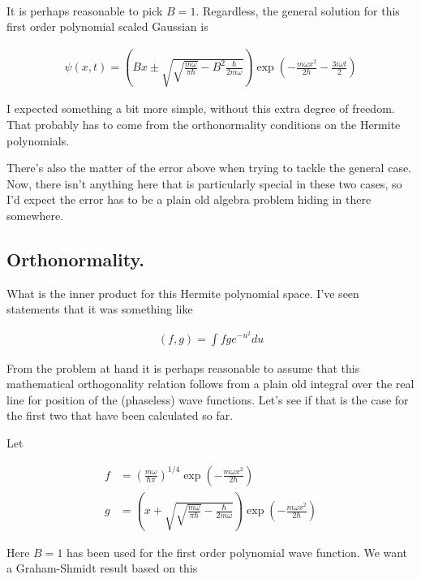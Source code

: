 \documentclass{article}
\begin{document}
\begin{align*}
\end{align*}

It is perhaps reasonable to pick $B=1$.  Regardless, the general solution for this first order polynomial scaled Gaussian is

\begin{align*}
\psi(x,t) = 
\left(B x \pm \sqrt{\sqrt{\frac{m \omega}{\pi \hbar}} - B^2 \frac{ \hbar}{ 2 m \omega} }\right) \exp\left( - \frac{m \omega x^2}{2 \hbar} - \frac{3 i \omega t }{ 2} \right)
\end{align*}

I expected something a bit more simple, without this extra degree of freedom.  That probably has to come from the orthonormality conditions on the
Hermite polynomials.

There's also the matter of the error above when trying to tackle the general case.  Now, there isn't anything here that is particularly special in these two
cases, so I'd expect the error has to be a plain old algebra problem 
hiding in there somewhere.

\subsection{Orthonormality. }

What is the inner product for this Hermite polynomial space.  I've seen statements that it was something like

\begin{align*}
(f,g) = \int f g e^{-u^2} du
\end{align*}

From the problem at hand it is perhaps reasonable to assume that this 
mathematical orthogonality relation follows from a plain old integral over
the real line for position of the (phaseless) wave functions.  Let's see
if that is the case for the first two that have been calculated so far.

Let

\begin{align*}
f &= 
\left( 
\frac{ m \omega }{\hbar \pi}
\right)^{1/4} \exp\left( - \frac{m \omega x^2 }{2 \hbar} \right) \\
g &=
\left(x + \sqrt{\sqrt{\frac{m \omega}{\pi \hbar}} - \frac{ \hbar}{ 2 m \omega} }\right) \exp\left( - \frac{m \omega x^2}{2 \hbar} \right)
\end{align*}

Here $B=1$ has been used for the first order polynomial wave function.  We want a Graham-Shmidt result based on this
\end{document}
